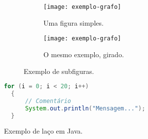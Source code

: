 
\begin{figure}
  \centering

  \begin{subfigure}{0.4\textwidth}
    \centering
    \texttt{[image: exemplo-grafo]}
    \caption{Uma figura simples.\label{fig:subfigures:a}}
  \end{subfigure}
  \begin{subfigure}{0.4\textwidth}
    \centering
    \begin{turn}{90}
      \texttt{[image: exemplo-grafo]}
    \end{turn}
    \caption{O mesmo exemplo, girado.\label{fig:subfigures:b}}
  \end{subfigure}

  \caption{Exemplo de subfiguras.\label{fig:subfigures}}
\end{figure}


\begin{program}
  \centering

\begin{lstlisting}[language=Java, style=wider]
  for (i = 0; i < 20; i++)
  {
      // Comentário
      System.out.println("Mensagem...");
  }
\end{lstlisting}

  \caption{Exemplo de laço em Java.\label{prog:java}}
\end{program}


